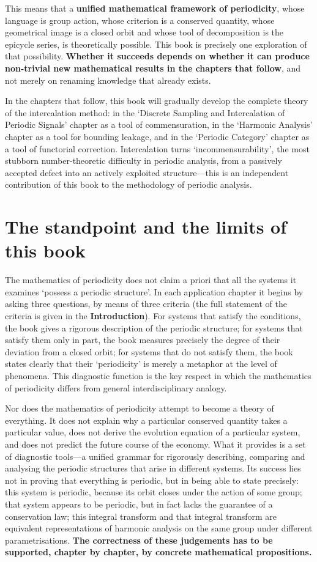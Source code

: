 This means that a \textbf{unified mathematical framework of periodicity}, whose language is group action, whose criterion is a conserved quantity, whose geometrical image is a closed orbit and whose tool of decomposition is the epicycle series, is theoretically possible. This book is precisely one exploration of that possibility. \textbf{Whether it succeeds depends on whether it can produce non-trivial new mathematical results in the chapters that follow}, and not merely on renaming knowledge that already exists.

In the chapters that follow, this book will gradually develop the complete theory of the intercalation method: in the `Discrete Sampling and Intercalation of Periodic Signals' chapter as a tool of commensuration, in the `Harmonic Analysis' chapter as a tool for bounding leakage, and in the `Periodic Category' chapter as a tool of functorial correction. Intercalation turns `incommensurability', the most stubborn number-theoretic difficulty in periodic analysis, from a passively accepted defect into an actively exploited structure---this is an independent contribution of this book to the methodology of periodic analysis.

\section*{The standpoint and the limits of this book}

The mathematics of periodicity does not claim a priori that all the systems it examines `possess a periodic structure'. In each application chapter it begins by asking three questions, by means of three criteria (the full statement of the criteria is given in the \textbf{Introduction}). For systems that satisfy the conditions, the book gives a rigorous description of the periodic structure; for systems that satisfy them only in part, the book measures precisely the degree of their deviation from a closed orbit; for systems that do not satisfy them, the book states clearly that their `periodicity' is merely a metaphor at the level of phenomena. This diagnostic function is the key respect in which the mathematics of periodicity differs from general interdisciplinary analogy.

Nor does the mathematics of periodicity attempt to become a theory of everything. It does not explain why a particular conserved quantity takes a particular value, does not derive the evolution equation of a particular system, and does not predict the future course of the economy. What it provides is a set of diagnostic tools---a unified grammar for rigorously describing, comparing and analysing the periodic structures that arise in different systems. Its success lies not in proving that everything is periodic, but in being able to state precisely: this system is periodic, because its orbit closes under the action of some group; that system appears to be periodic, but in fact lacks the guarantee of a conservation law; this integral transform and that integral transform are equivalent representations of harmonic analysis on the same group under different parametrisations. \textbf{The correctness of these judgements has to be supported, chapter by chapter, by concrete mathematical propositions.}

